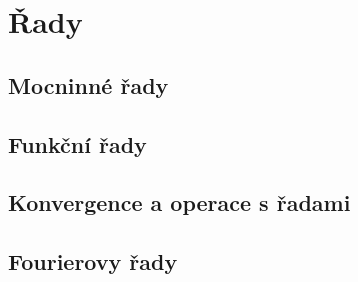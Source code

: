 \documentclass[../main.tex]{subfiles}
\begin{document}
    
\section{Řady}
\subsection{Mocninné řady}
\subsection{Funkční řady}
\subsection{Konvergence a operace s řadami}
\subsection{Fourierovy řady}
\end{document}
